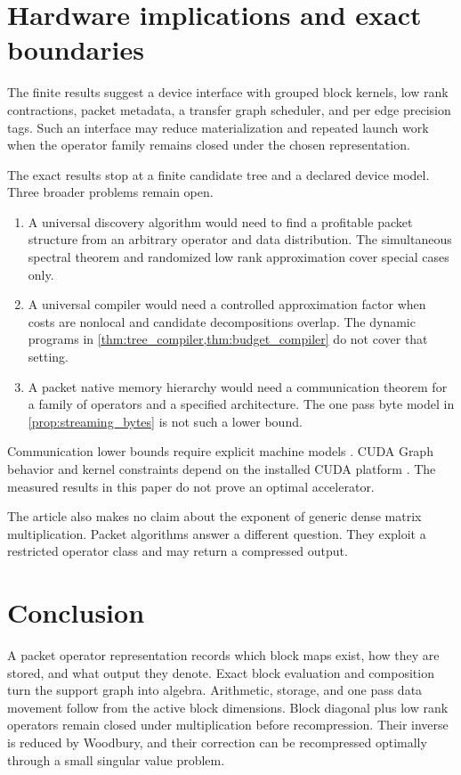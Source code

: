 \documentclass{aomart}
\theoremstyle{definition}
\theoremstyle{remark}
\begin{document}
\section{Hardware implications and exact boundaries}\label{sec:boundaries}

The finite results suggest a device interface with grouped block kernels, low rank contractions, packet metadata, a transfer graph scheduler, and per edge precision tags. Such an interface may reduce materialization and repeated launch work when the operator family remains closed under the chosen representation.

The exact results stop at a finite candidate tree and a declared device model. Three broader problems remain open.

\begin{enumerate}
\item A universal discovery algorithm would need to find a profitable packet structure from an arbitrary operator and data distribution. The simultaneous spectral theorem and randomized low rank approximation cover special cases only.
\item A universal compiler would need a controlled approximation factor when costs are nonlocal and candidate decompositions overlap. The dynamic programs in \cref{thm:tree_compiler,thm:budget_compiler} do not cover that setting.
\item A packet native memory hierarchy would need a communication theorem for a family of operators and a specified architecture. The one pass byte model in \cref{prop:streaming_bytes} is not such a lower bound.
\end{enumerate}

Communication lower bounds require explicit machine models \cite{HongKung1981,BallardDemmelHoltzSchwartz2011}. CUDA Graph behavior and kernel constraints depend on the installed CUDA platform \cite{NVIDIA2026}. The measured results in this paper do not prove an optimal accelerator.

The article also makes no claim about the exponent of generic dense matrix multiplication. Packet algorithms answer a different question. They exploit a restricted operator class and may return a compressed output.

\section{Conclusion}\label{sec:conclusion}

A packet operator representation records which block maps exist, how they are stored, and what output they denote. Exact block evaluation and composition turn the support graph into algebra. Arithmetic, storage, and one pass data movement follow from the active block dimensions. Block diagonal plus low rank operators remain closed under multiplication before recompression. Their inverse is reduced by Woodbury, and their correction can be recompressed optimally through a small singular value problem.
\end{document}

